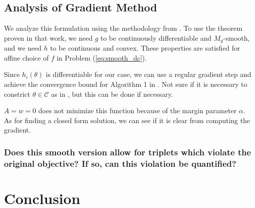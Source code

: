 \documentclass[11pt]{article}
\begin{document}




\subsection{Analysis of Gradient Method}

We analyze this formulation using the methodology from \cite{khamaru_convergence_2018}. To use the theorem proven in that work, we need $g$ to be continuously differentiable and $M_g$-smooth, and we need $h$ to be continuous and convex. These properties are satisfied for affine choice of $f$ in Problem (\ref{eq:smooth_dc}).

Since $h_i(\theta)$ is differentiable for our case, we can use a regular gradient step and achieve the convergence bound for Algorithm 1 in \cite{khamaru_convergence_2018}. Not sure if it is necessary to constrict $\theta \in \mathcal{C}$ as in \cite{khamaru_convergence_2018}, but this can be done if necessary.

$A = w = 0$ does not minimize this function because of the margin parameter $\alpha$. As for finding a closed form solution, we can see if it is clear from computing the gradient.

\subsubsection{Does this smooth version allow for triplets which violate the original objective? If so, can this violation be quantified?}

\section{Conclusion}
\end{document}
